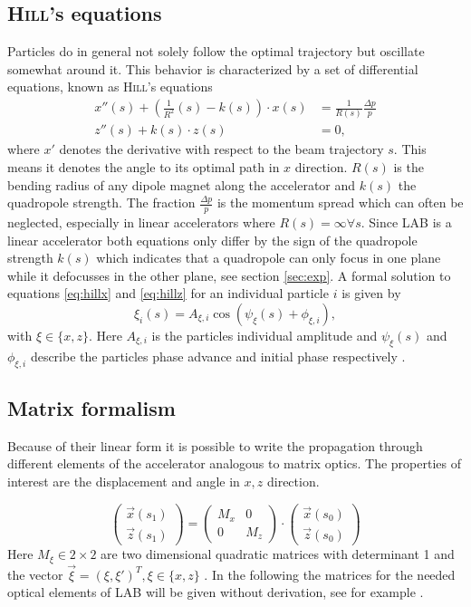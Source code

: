 \documentclass[11pt,a4paper,notitlepage]{scrartcl}
\begin{document}
\subsection{\textsc{Hill}'s equations}
Particles do in general not solely follow the optimal trajectory but oscillate somewhat around it. This behavior is characterized by a set of differential equations, known as \textsc{Hill}'s equations \cite{wille}
\begin{align}
	x''(s)+\left(\frac{1}{R^2}(s)-k(s)\right)\cdot x(s)&=\frac{1}{R(s)}\frac{\Delta p}{p} \label{eq:hillx} \\
	z''(s)+k(s)\cdot z(s)&=0,
	\label{eq:hillz}
\end{align}
where $x'$ denotes the derivative with respect to the beam trajectory $s$. This means it denotes the angle to its optimal path in $x$ direction. $R(s)$ is the bending radius of any dipole magnet along the accelerator and $k(s)$ the quadropole strength. The fraction $\frac{\Delta p}{p}$ is the momentum spread which can often be neglected, especially in linear accelerators where $R(s)=\infty \forall s$. Since LAB is a linear accelerator both equations only differ by the sign of the quadropole strength $k(s)$ which indicates that a quadropole can only focus in one plane while it defocusses in the other plane, see section \ref{sec:exp}. A formal solution to equations \eqref{eq:hillx} and \eqref{eq:hillz} for an individual particle $i$ is given by $$\xi_i(s)=A_{\xi,i}\cos(\psi_\xi(s)+\phi_{\xi,i}),$$ with $\xi\in \{x,z\}$. 
Here $A_{\xi,i}$ is the particles individual amplitude and $\psi_\xi(s)$ and $\phi_{\xi,i}$ describe the particles phase advance and initial phase respectively \cite{wille}. 
\subsection{Matrix formalism}\label{subsec:Matrix_formalism}
Because of their linear form it is possible to write the propagation through different elements of the accelerator analogous to matrix optics. The properties of interest are the displacement and angle in $x,z$ direction.

 \begin{equation}
 	\begin{pmatrix}
 		\vec{x}(s_1) \\ \vec{z}(s_1)
 	\end{pmatrix}
 =\begin{pmatrix}
 	M_x  & 0 \\
 	0 & M_z
 \end{pmatrix}
\cdot
\begin{pmatrix}
	\vec{x}(s_0) \\ \vec{z}(s_0)
\end{pmatrix}
\end{equation}
Here $M_{\xi}\in2 \times 2$ are two dimensional quadratic matrices with determinant 1 and the vector $\vec{\xi}=(\xi,\xi')^T, \xi\in\{x,z\}$ \cite{wille}. In the following the matrices for the needed optical elements of LAB will be given without derivation, see for example \cite{wille}.
\end{document}
